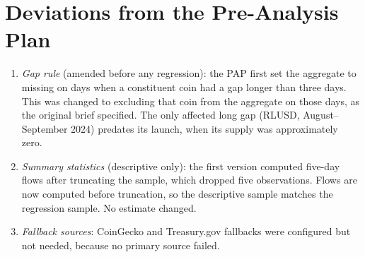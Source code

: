 \section{Deviations from the Pre-Analysis Plan}\label{app:deviations}
\begin{enumerate}
\item \emph{Gap rule} (amended before any regression): the PAP first set the aggregate to missing on days when a constituent coin had a gap longer than three days. This was changed to excluding that coin from the aggregate on those days, as the original brief specified. The only affected long gap (RLUSD, August--September 2024) predates its launch, when its supply was approximately zero.
\item \emph{Summary statistics} (descriptive only): the first version computed five-day flows after truncating the sample, which dropped five observations. Flows are now computed before truncation, so the descriptive sample matches the regression sample. No estimate changed.
\item \emph{Fallback sources}: CoinGecko and Treasury.gov fallbacks were configured but not needed, because no primary source failed.
\end{enumerate}
